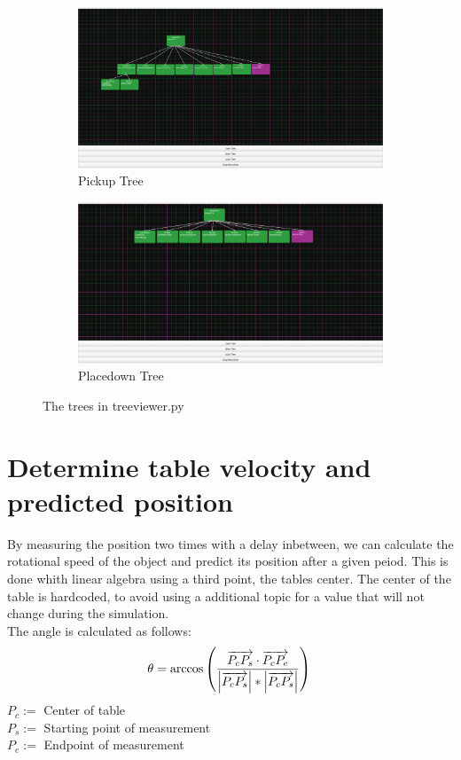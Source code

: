 \documentclass[report]{iisthesis}
\begin{document}
\begin{figure}[htp]
    \begin{subfigure}[b]{.45\linewidth}
        \includegraphics[width=\linewidth]{pickupTree.png}
        \caption{Pickup Tree}
    \end{subfigure}
    \begin{subfigure}[b]{.45\linewidth}
        \includegraphics[width=\linewidth]{placedownTree.png}
        \caption{Placedown Tree}
    \end{subfigure}
    \caption{The trees in treeviewer.py}
\end{figure}
\newpage
\section{Determine table velocity and predicted position}
By measuring the position two times with a delay inbetween, we can calculate the rotational speed of the object and predict its position after a given peiod.
This is done whith linear algebra using a third point, the tables center. The center of the table is hardcoded, to avoid using a additional topic for a value that will not change during the simulation. \\
The angle is calculated as follows:
$$
\theta = \arccos \left ( \frac{\overrightarrow{P_cP_s} \cdot \overrightarrow{P_cP_e}}{\left | \overrightarrow{P_cP_s} \right | * \left | \overrightarrow{P_cP_s} \right |} \right) \\
$$
$P_c :=$ Center of table \\
$P_s :=$ Starting point of measurement \\
$P_e :=$ Endpoint of measurement \\
\end{document}
